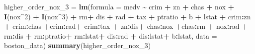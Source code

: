\documentclass[
]{article}
\newenvironment{Shaded}{\begin{snugshade}}{\end{snugshade}}
\newcommand{\AttributeTok}[1]{\textcolor[rgb]{0.13,0.29,0.53}{#1}}
\newcommand{\DecValTok}[1]{\textcolor[rgb]{0.00,0.00,0.81}{#1}}
\newcommand{\FunctionTok}[1]{\textcolor[rgb]{0.13,0.29,0.53}{\textbf{#1}}}
\newcommand{\NormalTok}[1]{#1}
\newcommand{\OtherTok}[1]{\textcolor[rgb]{0.56,0.35,0.01}{#1}}
\newcommand{\SpecialCharTok}[1]{\textcolor[rgb]{0.81,0.36,0.00}{\textbf{#1}}}
\begin{document}
\begin{Shaded}
\begin{Highlighting}[]
\NormalTok{higher\_order\_nox\_3 }\OtherTok{=} \FunctionTok{lm}\NormalTok{(}\AttributeTok{formula =}\NormalTok{ medv }\SpecialCharTok{\textasciitilde{}}\NormalTok{ crim }\SpecialCharTok{+}\NormalTok{ zn }\SpecialCharTok{+}\NormalTok{ chas }\SpecialCharTok{+}\NormalTok{ nox }\SpecialCharTok{+} \FunctionTok{I}\NormalTok{(nox}\SpecialCharTok{\^{}}\DecValTok{2}\NormalTok{) }\SpecialCharTok{+} \FunctionTok{I}\NormalTok{(nox}\SpecialCharTok{\^{}}\DecValTok{3}\NormalTok{) }\SpecialCharTok{+}\NormalTok{ rm}\SpecialCharTok{+}\NormalTok{ dis }\SpecialCharTok{+}\NormalTok{ rad }\SpecialCharTok{+}\NormalTok{ tax }\SpecialCharTok{+}\NormalTok{ ptratio }\SpecialCharTok{+}\NormalTok{ b }\SpecialCharTok{+}\NormalTok{ lstat }\SpecialCharTok{+}\NormalTok{ crim}\SpecialCharTok{:}\NormalTok{zn }\SpecialCharTok{+}\NormalTok{ crim}\SpecialCharTok{:}\NormalTok{chas  }\SpecialCharTok{+}\NormalTok{crim}\SpecialCharTok{:}\NormalTok{rad}\SpecialCharTok{+}\NormalTok{ crim}\SpecialCharTok{:}\NormalTok{tax }\SpecialCharTok{+}\NormalTok{ zn}\SpecialCharTok{:}\NormalTok{dis}\SpecialCharTok{+}\NormalTok{ chas}\SpecialCharTok{:}\NormalTok{nox }\SpecialCharTok{+}\NormalTok{chas}\SpecialCharTok{:}\NormalTok{rm }\SpecialCharTok{+}\NormalTok{ nox}\SpecialCharTok{:}\NormalTok{rad }\SpecialCharTok{+}\NormalTok{ rm}\SpecialCharTok{:}\NormalTok{dis }\SpecialCharTok{+}\NormalTok{ rm}\SpecialCharTok{:}\NormalTok{ptratio}\SpecialCharTok{+}\NormalTok{ rm}\SpecialCharTok{:}\NormalTok{lstat}\SpecialCharTok{+}\NormalTok{ dis}\SpecialCharTok{:}\NormalTok{rad }\SpecialCharTok{+}\NormalTok{ dis}\SpecialCharTok{:}\NormalTok{lstat}\SpecialCharTok{+}\NormalTok{ b}\SpecialCharTok{:}\NormalTok{lstat, }\AttributeTok{data =}\NormalTok{ boston\_data)}
\FunctionTok{summary}\NormalTok{(higher\_order\_nox\_3)}
\end{Highlighting}
\end{Shaded}
\end{document}
